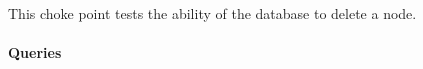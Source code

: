 
This choke point tests the ability of the database to delete a node.


\paragraph{Queries}
{\raggedright
}